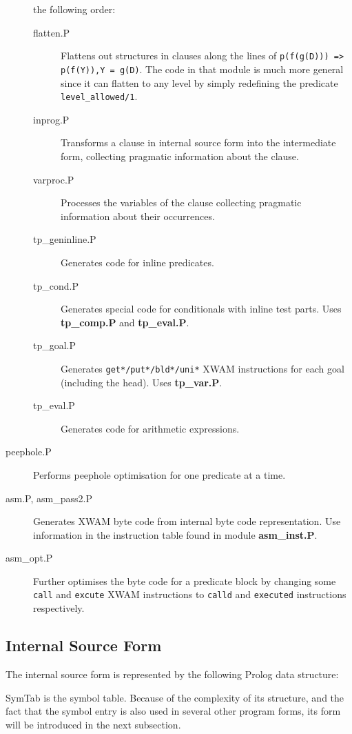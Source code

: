 \begin{description}
		the following order:
	\begin{description}
	\item[flatten.P] Flattens out structures in clauses along the lines of
		{\tt p(f(g(D))) => p(f(Y)),Y = g(D)}.  The code in that module 
		is much more general since it can flatten to any level by
		simply redefining the predicate {\tt level\_allowed/1}.
	\item[inprog.P] Transforms a clause in internal source form into the
		intermediate form, collecting pragmatic information
		about the clause.
	\item[varproc.P] Processes the variables of the clause collecting
		pragmatic information about their occurrences.
	\item[tp\_geninline.P] Generates code for inline predicates.
	\item[tp\_cond.P] Generates special code for conditionals with
		inline test parts.  Uses {\bf tp\_comp.P} and {\bf
		tp\_eval.P}.
	\item[tp\_goal.P] Generates {\tt get*/put*/bld*/uni*} XWAM instructions
 		for each goal (including the head).  Uses {\bf tp\_var.P}.
	\item[tp\_eval.P] Generates code for arithmetic expressions.
	\end{description}
\item[peephole.P]
		Performs peephole optimisation for one predicate at a time.
\item[asm.P, asm\_pass2.P]
		Generates XWAM byte code from internal byte code
		representation.  Use information in the instruction table 
		found in module {\bf asm\_inst.P}.
\item[asm\_opt.P] Further optimises the byte code for a predicate block
		by changing some {\tt call} and {\tt excute} XWAM instructions
		to {\tt calld} and {\tt executed} instructions respectively.
\end{description}

\subsection{Internal Source Form}

The internal source form is represented by the following Prolog data structure:


{\sf SymTab} is the symbol table. Because of the complexity of its
structure, and the fact that the symbol entry is also used in
several other program forms, its form will be introduced in the
next subsection.

